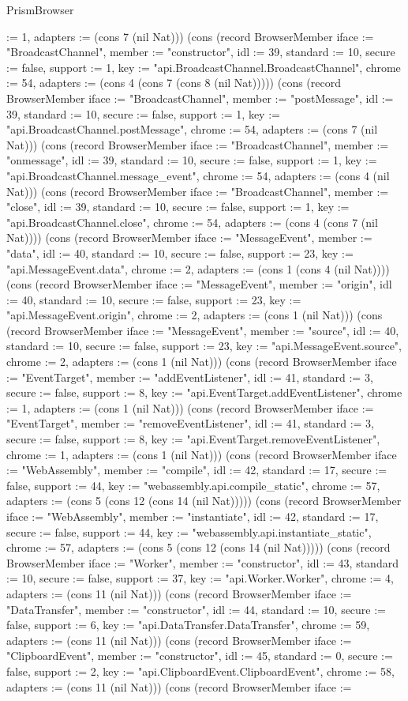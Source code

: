 \begin{lexlean}{PrismBrowser}
\begin{semanticmodule}
{:= 1, adapters := (cons 7 (nil Nat))}) (cons (record BrowserMember {iface := "BroadcastChannel", member := "constructor", idl := 39, standard := 10, secure := false, support := 1, key := "api.BroadcastChannel.BroadcastChannel", chrome := 54, adapters := (cons 4 (cons 7 (cons 8 (nil Nat))))}) (cons (record BrowserMember {iface := "BroadcastChannel", member := "postMessage", idl := 39, standard := 10, secure := false, support := 1, key := "api.BroadcastChannel.postMessage", chrome := 54, adapters := (cons 7 (nil Nat))}) (cons (record BrowserMember {iface := "BroadcastChannel", member := "onmessage", idl := 39, standard := 10, secure := false, support := 1, key := "api.BroadcastChannel.message_event", chrome := 54, adapters := (cons 4 (nil Nat))}) (cons (record BrowserMember {iface := "BroadcastChannel", member := "close", idl := 39, standard := 10, secure := false, support := 1, key := "api.BroadcastChannel.close", chrome := 54, adapters := (cons 4 (cons 7 (nil Nat)))}) (cons (record BrowserMember {iface := "MessageEvent", member := "data", idl := 40, standard := 10, secure := false, support := 23, key := "api.MessageEvent.data", chrome := 2, adapters := (cons 1 (cons 4 (nil Nat)))}) (cons (record BrowserMember {iface := "MessageEvent", member := "origin", idl := 40, standard := 10, secure := false, support := 23, key := "api.MessageEvent.origin", chrome := 2, adapters := (cons 1 (nil Nat))}) (cons (record BrowserMember {iface := "MessageEvent", member := "source", idl := 40, standard := 10, secure := false, support := 23, key := "api.MessageEvent.source", chrome := 2, adapters := (cons 1 (nil Nat))}) (cons (record BrowserMember {iface := "EventTarget", member := "addEventListener", idl := 41, standard := 3, secure := false, support := 8, key := "api.EventTarget.addEventListener", chrome := 1, adapters := (cons 1 (nil Nat))}) (cons (record BrowserMember {iface := "EventTarget", member := "removeEventListener", idl := 41, standard := 3, secure := false, support := 8, key := "api.EventTarget.removeEventListener", chrome := 1, adapters := (cons 1 (nil Nat))}) (cons (record BrowserMember {iface := "WebAssembly", member := "compile", idl := 42, standard := 17, secure := false, support := 44, key := "webassembly.api.compile_static", chrome := 57, adapters := (cons 5 (cons 12 (cons 14 (nil Nat))))}) (cons (record BrowserMember {iface := "WebAssembly", member := "instantiate", idl := 42, standard := 17, secure := false, support := 44, key := "webassembly.api.instantiate_static", chrome := 57, adapters := (cons 5 (cons 12 (cons 14 (nil Nat))))}) (cons (record BrowserMember {iface := "Worker", member := "constructor", idl := 43, standard := 10, secure := false, support := 37, key := "api.Worker.Worker", chrome := 4, adapters := (cons 11 (nil Nat))}) (cons (record BrowserMember {iface := "DataTransfer", member := "constructor", idl := 44, standard := 10, secure := false, support := 6, key := "api.DataTransfer.DataTransfer", chrome := 59, adapters := (cons 11 (nil Nat))}) (cons (record BrowserMember {iface := "ClipboardEvent", member := "constructor", idl := 45, standard := 0, secure := false, support := 2, key := "api.ClipboardEvent.ClipboardEvent", chrome := 58, adapters := (cons 11 (nil Nat))}) (cons (record BrowserMember {iface := }
\end{semanticmodule}
\end{lexlean}
